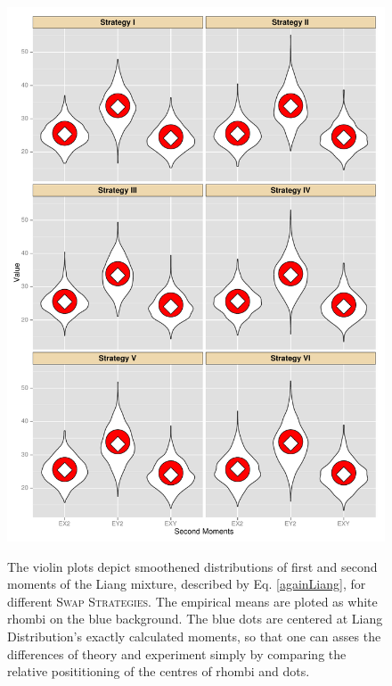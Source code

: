 \documentclass{book}
\begin{document}
\begin{figure}
\begin{minipage}[b]{.5\linewidth}
		\centering \includegraphics[width=\textwidth,keepaspectratio=TRUE]{./img/secondMomentsBaragatti.pdf}
	\label{secondMomentsBaragatti}
	\end{minipage}
	\caption{
		The violin plots depict smoothened distributions of first and second moments of the Liang mixture, described by Eq. \ref{againLiang}, for different \textsc{Swap Strategies}. The empirical means are ploted as white rhombi on the blue background. The blue dots are centered at Liang Distribution's exactly calculated moments, so that one can asses the differences of theory and experiment simply by comparing the relative posititioning of the centres of rhombi and dots.
	}\label{momentsBaragatti}
\end{figure}






	
	
\end{document}
